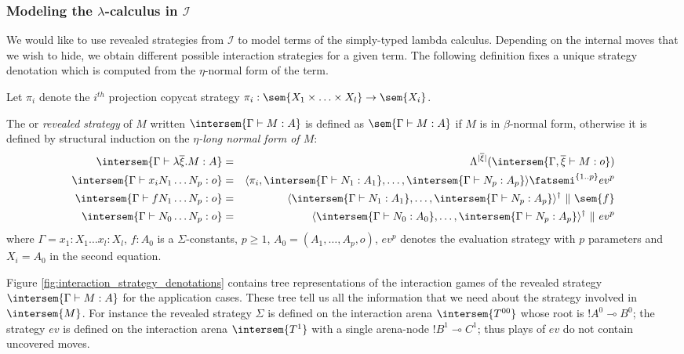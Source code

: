 \subsubsection{Modeling the $\lambda$-calculus in $\mathcal{I}$}

We would like to use revealed strategies from $\mathcal{I}$ to model terms of
the simply-typed lambda calculus.
Depending on the internal moves that we wish to hide, we obtain different possible interaction strategies for a given term.
The following definition fixes a unique strategy denotation which is computed from the $\eta$-normal form of the term.

\begin{definition}
\label{dfn:interactionstrategy_ofterms}
Let $\pi_i$ denote the $i^{th}$ projection copycat strategy $\pi_i : \sem{X_1 \times \ldots \times X_l} \rightarrow \sem{X_i}$.

The  or \emph{revealed strategy} of
$M$ written $\intersem{\Gamma \vdash M : A}$ is defined as
$\sem{\Gamma \vdash M : A}$ if $M$ is in $\beta$-normal form, otherwise
it is defined by structural induction on the \emph{$\eta$-long normal form of $M$}:
\begin{eqnarray*}
\intersem{\Gamma \vdash \lambda \overline{\xi} . M  : A} &=& \Lambda^{|\overline{\xi}|}(\intersem{\Gamma, \overline{\xi} \vdash M : o })  \\
\intersem{\Gamma  \vdash x_i N_1 \ldots N_p :o} &=& \langle \pi_i, \intersem{\Gamma \vdash N_1 : A_1}, \ldots, \intersem{\Gamma \vdash N_p : A_p}  \rangle \fatsemi ^{\{1..p\}} ev^p \\
\intersem{\Gamma \vdash f N_1 \ldots N_p : o} &=& \langle \intersem{\Gamma \vdash N_1 : A_1}, \ldots, \intersem{\Gamma \vdash N_p : A_p} \rangle^\dagger\  \|\ \sem{f} \\
\intersem{\Gamma \vdash N_0 \ldots N_p : o} &=& \langle \intersem{\Gamma \vdash N_0 : A_0}, \ldots, \intersem{\Gamma \vdash N_p : A_p}  \rangle^\dagger\ \|\ ev^p
\end{eqnarray*}
where $\Gamma = x_1 : X_1 \ldots x_l : X_l$, $f : A_0$ is a $\Sigma$-constants, $p\geq 1$, $A_0 =
(A_1,\ldots,A_p,o)$, $ev^p$ denotes the evaluation strategy with
$p$ parameters and $X_i = A_0$ in the second equation.
\end{definition}

Figure \ref{fig:interaction_strategy_denotations} contains tree representations of the interaction games of the revealed strategy $\intersem{\Gamma \vdash M : A}$ for the application cases. These tree tell us all the information that we need about the strategy involved in $\intersem{M}$. For instance the revealed strategy $\Sigma$ is defined on the interaction arena $\intersem{T^{00}}$ whose root is $!A^0 \multimap B^0$; the strategy $ev$ is defined on the interaction arena $\intersem{T^1}$ with a single arena-node $!B^1 \multimap C^1$; thus plays of $ev$ do not contain uncovered moves.


